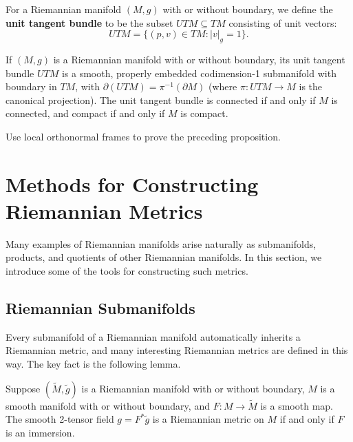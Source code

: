 For a Riemannian manifold $(M, g)$ with or without boundary, we define the \textbf{unit tangent bundle} to be the subset $UTM \subseteq TM$ consisting of unit vectors:
\begin{equation}
UTM = \{(p, v) \in TM : |v|_g = 1\}.
\tag{2.10}
\end{equation}

\begin{proposition}
\label{prop:unit-tangent-bundle-properties}

If $(M, g)$ is a Riemannian manifold with or without boundary, its unit tangent bundle $UTM$ is a smooth, properly embedded codimension-1 submanifold with boundary in $TM$, with $\partial(UTM) = \pi^{-1}(\partial M)$ (where $\pi : UTM \to M$ is the canonical projection). The unit tangent bundle is connected if and only if $M$ is connected, and compact if and only if $M$ is compact.
\end{proposition}

\begin{exercise}
\label{exer:orthonormal-frames-proposition}
Use local orthonormal frames to prove the preceding proposition.
\end{exercise}

\section{Methods for Constructing Riemannian Metrics}

Many examples of Riemannian manifolds arise naturally as submanifolds, products, and quotients of other Riemannian manifolds. In this section, we introduce some of the tools for constructing such metrics.

\subsection*{Riemannian Submanifolds}

Every submanifold of a Riemannian manifold automatically inherits a Riemannian metric, and many interesting Riemannian metrics are defined in this way. The key fact is the following lemma.

\begin{lemma}
\label{lem:pullback-immersion-metric}
\leanok
{}
Suppose $(\tilde{M}, \tilde{g})$ is a Riemannian manifold with or without boundary, $M$ is a smooth manifold with or without boundary, and $F : M \to \tilde{M}$ is a smooth map. The smooth 2-tensor field $g = F^*\tilde{g}$ is a Riemannian metric on $M$ if and only if $F$ is an immersion.
\end{lemma}

